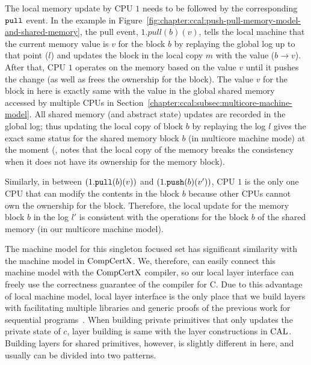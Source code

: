 The local memory update by CPU $1$ needs to be followed by the corresponding ${\mathrm{\texttt{pull}}}$ event.
In the example in Figure~\ref{fig:chapter:ccal:push-pull-memory-model-and-shared-memory},
the pull event, $1.pull(b)(v)$, tells the local machine that the current memory value is 
$v$ for the block $b$ by replaying the global log up to that point ($l$)
and updates the block in the local copy $m$ with the value ($b \rightarrow v$). 
After that, CPU $1$ operates on the memory based on the value $v$ until it pushes the change (as well as frees the ownership for the block).
The value $v$ for the block in here is exactly same with the value in the global shared memory accessed by multiple CPUs in Section~\ref{chapter:ccal:subsec:multicore-machine-model}.
All shared memory (and abstract state) updates are recorded in the global log; thus
updating the local copy of block $b$ by replaying the log $l$ gives the exact same status for the shared memory block $b$ (in multicore machine mode) at the moment
(\ie, notes that the local copy of the memory breaks the consistency when it does not have its ownership for the memory block). 

Similarly,  in between $(1.{\mathrm{\texttt{pull}}}(b)(v))$ and $(1.{\mathrm{\texttt{push}}}(b)(v'))$, 
CPU $1$ is the only one CPU that can modify the contents in the block $b$
because other CPUs cannot own the ownership for the block.
Therefore, the local update for the memory block $b$ in the log $l'$ 
is consistent with the operations for the block $b$ of the shared memory (in our multicore machine model).

The machine model for this singleton focused set has significant similarity with the machine model in $\mathrm{CompCertX}$. 
We, therefore, can easily connect this machine model with the $\mathrm{CompCertX}$ compiler, 
so our local layer interface can freely use the correctness guarantee of the compiler for C. 
Due to this advantage of local machine model, local layer interface is the only place that we build layers with facilitating multiple libraries and generic proofs of the previous work for sequential programs~\cite{deepspec}. 
When building private primitives that only updates the private state of $c$, 
layer building is same with the layer constructions in $\mathrm{CAL}$.
Building layers for shared primitives, however, is slightly different in here, and usually can be divided into 
two patterns.

